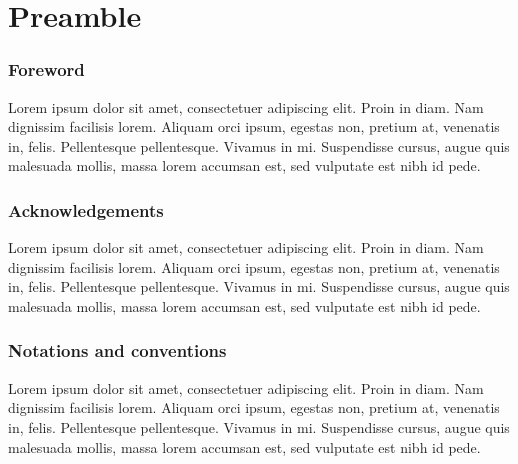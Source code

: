 
\chapter*{Preamble}

\subsection*{Foreword}
Lorem ipsum dolor sit amet, consectetuer adipiscing elit. Proin in diam. Nam dignissim facilisis lorem. Aliquam orci ipsum, egestas non, pretium at, venenatis in, felis. Pellentesque pellentesque. Vivamus in mi. Suspendisse cursus, augue quis malesuada mollis, massa lorem accumsan est, sed vulputate est nibh id pede.

\subsection*{Acknowledgements}
Lorem ipsum dolor sit amet, consectetuer adipiscing elit. Proin in diam. Nam dignissim facilisis lorem. Aliquam orci ipsum, egestas non, pretium at, venenatis in, felis. Pellentesque pellentesque. Vivamus in mi. Suspendisse cursus, augue quis malesuada mollis, massa lorem accumsan est, sed vulputate est nibh id pede.

\subsection*{Notations and conventions}
Lorem ipsum dolor sit amet, consectetuer adipiscing elit. Proin in diam. Nam dignissim facilisis lorem. Aliquam orci ipsum, egestas non, pretium at, venenatis in, felis. Pellentesque pellentesque. Vivamus in mi. Suspendisse cursus, augue quis malesuada mollis, massa lorem accumsan est, sed vulputate est nibh id pede.
